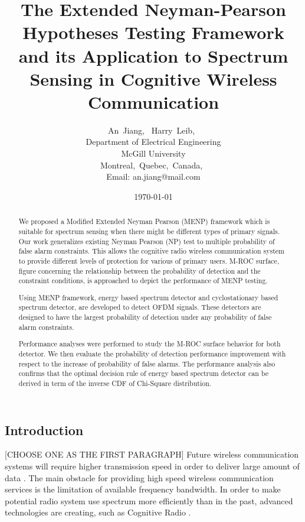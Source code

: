 \documentclass{report}
\author{An~Jiang,~
        Harry~Leib,~\\
          Department of Electrical Engineering\\
          McGill University\\
          Montreal,~Quebec,~Canada,~\\
          Email: an.jiang@mail.com}
\title{The Extended Neyman-Pearson Hypotheses Testing Framework and its Application to Spectrum Sensing in Cognitive Wireless Communication}
\date{\today}
\begin{document}
\begin{spacing}{2.0}
\maketitle
\begin{abstract}
We proposed a Modified Extended Neyman Pearson (MENP) framework which is suitable for spectrum sensing when there might be different types of primary signals. Our work generalizes existing Neyman Pearson (NP) test to multiple probability of false alarm constraints. This allows the cognitive radio wireless communication system to provide different levels of protection for various of primary users.  
M-ROC surface, figure concerning the relationship between the probability of detection and the constraint conditions, is approached to depict the performance of MENP testing.   

Using MENP framework, energy based spectrum detector and cyclostationary based spectrum detector, are developed to detect OFDM signals. These detectors are designed to have the largest probability of detection under any probability of false alarm constraints.  

Performance analyses were performed to study the M-ROC surface behavior for both detector. We then evaluate the probability of detection performance improvement with respect to the increase of probability of false alarms.  
The performance analysis also confirms that the optimal decision rule of energy based spectrum detector can be derived in term of the inverse CDF of Chi-Square distribution.  
\end{abstract}
\section{Introduction}
[CHOOSE ONE AS THE FIRST PARAGRAPH]
Future wireless communication systems will require higher transmission speed in order to deliver large amount of data \cite{pelcat20133gpp}. The main obstacle for providing high speed wireless communication services is the limitation of available frequency bandwidth. In order to make potential radio system use spectrum more efficiently than in the past, advanced technologies are creating, such as Cognitive Radio \cite{nonotice}. 


\end{spacing}
\end{document}
